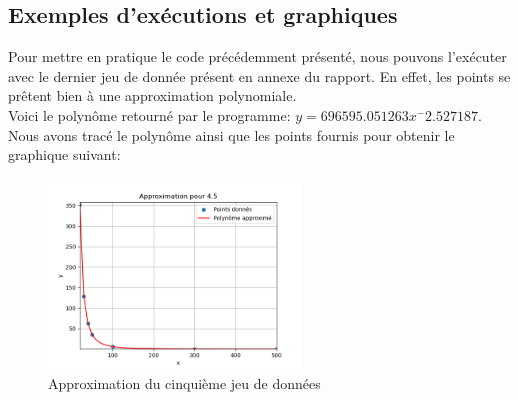 \subsection{Exemples d'exécutions et graphiques}
Pour mettre en pratique le code précédemment présenté, nous pouvons l'exécuter avec le dernier jeu de donnée présent en annexe du rapport. En effet, les points se prêtent bien à une approximation polynomiale.\\
Voici le polynôme retourné par le programme: $y=696595.051263x^-2.527187$. Nous avons tracé le polynôme ainsi que les points fournis pour obtenir le graphique suivant:\\
\begin{figure}[H]
    \centering
    \includegraphics[width=0.6\textwidth]{sources/Corentin/approximationC/results/graphs/45.png}
    \caption{Approximation du cinquième jeu de données}
\end{figure}

